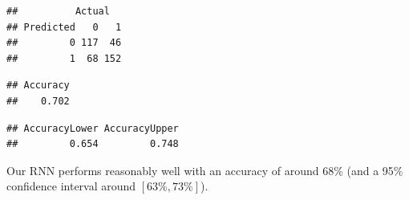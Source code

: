 \documentclass[12pt]{article}
\newenvironment{Shaded}{\begin{snugshade}}{\end{snugshade}}
\newcommand{\CommentTok}[1]{\textcolor[rgb]{0.56,0.35,0.01}{\textit{#1}}}
\newcommand{\DecValTok}[1]{\textcolor[rgb]{0.00,0.00,0.81}{#1}}
\newcommand{\KeywordTok}[1]{\textcolor[rgb]{0.13,0.29,0.53}{\textbf{#1}}}
\newcommand{\NormalTok}[1]{#1}
\newcommand{\OperatorTok}[1]{\textcolor[rgb]{0.81,0.36,0.00}{\textbf{#1}}}
\begin{document}
\begin{verbatim}
##          Actual
## Predicted   0   1
##         0 117  46
##         1  68 152
\end{verbatim}

\begin{Shaded}
\end{Shaded}

\begin{verbatim}
## Accuracy 
##    0.702
\end{verbatim}

\begin{Shaded}
\end{Shaded}

\begin{verbatim}
## AccuracyLower AccuracyUpper 
##         0.654         0.748
\end{verbatim}

Our RNN performs reasonably well with an accuracy of around \(68\%\)
(and a 95\% confidence interval around \([63\%, 73\%]\)).

\newpage



\end{document}
